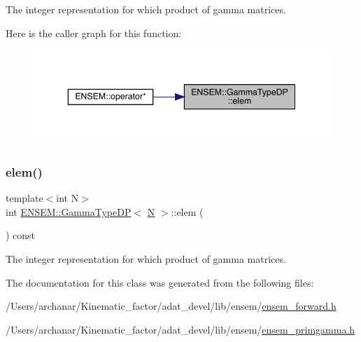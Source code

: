 The integer representation for which product of gamma matrices. 

Here is the caller graph for this function\+:\nopagebreak
\begin{figure}[H]
\begin{center}
\leavevmode
\includegraphics[width=343pt]{d4/d0d/classENSEM_1_1GammaTypeDP_a0d7ad0581feda4578c3ee7631ce730e2_icgraph}
\end{center}
\end{figure}
\mbox{\label{classENSEM_1_1GammaTypeDP_a0d7ad0581feda4578c3ee7631ce730e2}} 
\subsubsection{\texorpdfstring{elem()}{elem()}\hspace{0.1cm}{\footnotesize\ttfamily [2/2]}}
{\footnotesize\ttfamily template$<$int N$>$ \\
int \mbox{\hyperlink{classENSEM_1_1GammaTypeDP}{E\+N\+S\+E\+M\+::\+Gamma\+Type\+DP}}$<$ \mbox{\hyperlink{operator__name__util_8cc_a7722c8ecbb62d99aee7ce68b1752f337}{N}} $>$\+::elem (\begin{DoxyParamCaption}{ }\end{DoxyParamCaption}) const\hspace{0.3cm}{\ttfamily [inline]}}



The integer representation for which product of gamma matrices. 



The documentation for this class was generated from the following files\+:\begin{DoxyCompactItemize}
\item 
/\+Users/archanar/\+Kinematic\+\_\+factor/adat\+\_\+devel/lib/ensem/\mbox{\hyperlink{lib_2ensem_2ensem__forward_8h}{ensem\+\_\+forward.\+h}}\item 
/\+Users/archanar/\+Kinematic\+\_\+factor/adat\+\_\+devel/lib/ensem/\mbox{\hyperlink{lib_2ensem_2ensem__primgamma_8h}{ensem\+\_\+primgamma.\+h}}\end{DoxyCompactItemize}

